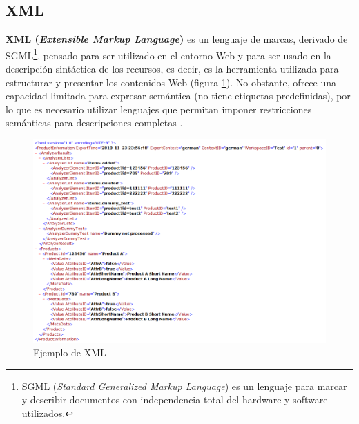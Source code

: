 \subsection{XML} %





\textbf{XML (\textit{Extensible Markup Language})} es un lenguaje de marcas, derivado de SGML\footnote{SGML (\textit{Standard Generalized Markup Language}) es un lenguaje para marcar y describir documentos con independencia total del hardware y software utilizados.}, pensado para ser utilizado en el entorno Web y para ser usado en la descripción sintáctica de los recursos, es decir, es la herramienta utilizada para estructurar y presentar los contenidos Web (figura \ref{fig:1kwulhdymttawk7zefee8q}). No obstante, ofrece una capacidad limitada para expresar semántica (no tiene etiquetas predefinidas), por lo que es necesario utilizar lenguajes que permitan imponer restricciones semánticas para descripciones completas \cite{aplicacion}.

\begin{figure}[H]
	\centering
	\includegraphics[width=1\linewidth]{imagenes/capitulo3/1*kwUlHDYmt_TaWK7ZefEE8Q}
	\caption{Ejemplo de XML}
	\label{fig:1kwulhdymttawk7zefee8q}
\end{figure}


